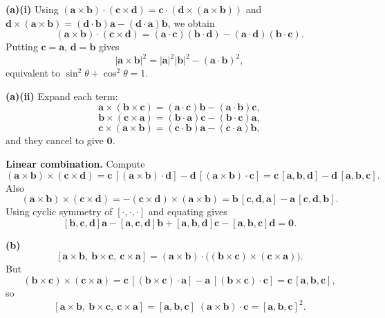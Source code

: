\begin{solution}
\textbf{(a)(i)} Using \((\mathbf a\times\mathbf b)\cdot(\mathbf c\times\mathbf d)=\mathbf c\cdot(\mathbf d\times(\mathbf a\times\mathbf b))\) and
\(\mathbf d\times(\mathbf a\times\mathbf b)=(\mathbf d\cdot\mathbf b)\mathbf a-(\mathbf d\cdot\mathbf a)\mathbf b\), we obtain
\[
(\mathbf a\times\mathbf b)\cdot(\mathbf c\times\mathbf d)
=(\mathbf a\cdot\mathbf c)(\mathbf b\cdot\mathbf d)-(\mathbf a\cdot\mathbf d)(\mathbf b\cdot\mathbf c).
\]
Putting \(\mathbf c=\mathbf a\), \(\mathbf d=\mathbf b\) gives
\[
|\mathbf a\times\mathbf b|^2=|\mathbf a|^2|\mathbf b|^2-(\mathbf a\cdot\mathbf b)^2,
\]
equivalent to \(\sin^2\theta+\cos^2\theta=1\).

\textbf{(a)(ii)} Expand each term:
\[
\mathbf a\times(\mathbf b\times\mathbf c)=(\mathbf a\cdot\mathbf c)\mathbf b-(\mathbf a\cdot\mathbf b)\mathbf c,
\]
\[
\mathbf b\times(\mathbf c\times\mathbf a)=(\mathbf b\cdot\mathbf a)\mathbf c-(\mathbf b\cdot\mathbf c)\mathbf a,
\]
\[
\mathbf c\times(\mathbf a\times\mathbf b)=(\mathbf c\cdot\mathbf b)\mathbf a-(\mathbf c\cdot\mathbf a)\mathbf b,
\]
and they cancel to give \(\mathbf 0\).

\medskip
\noindent\textbf{Linear combination.}
Compute
\[
(\mathbf a\times\mathbf b)\times(\mathbf c\times\mathbf d)
=\mathbf c\,[(\mathbf a\times\mathbf b)\cdot\mathbf d]-\mathbf d\,[(\mathbf a\times\mathbf b)\cdot\mathbf c]
=\mathbf c\,[\mathbf a,\mathbf b,\mathbf d]-\mathbf d\,[\mathbf a,\mathbf b,\mathbf c].
\]
Also
\[
(\mathbf a\times\mathbf b)\times(\mathbf c\times\mathbf d)
=-(\mathbf c\times\mathbf d)\times(\mathbf a\times\mathbf b)
=\mathbf b\,[\mathbf c,\mathbf d,\mathbf a]-\mathbf a\,[\mathbf c,\mathbf d,\mathbf b].
\]
Using cyclic symmetry of \([\cdot,\cdot,\cdot]\) and equating gives
\[
[\mathbf b,\mathbf c,\mathbf d]\mathbf a-[\mathbf a,\mathbf c,\mathbf d]\mathbf b+[\mathbf a,\mathbf b,\mathbf d]\mathbf c-[\mathbf a,\mathbf b,\mathbf c]\mathbf d=\mathbf 0.
\]

\medskip
\noindent\textbf{(b)}
\[
[\mathbf a\times\mathbf b,\ \mathbf b\times\mathbf c,\ \mathbf c\times\mathbf a]
=(\mathbf a\times\mathbf b)\cdot\bigl((\mathbf b\times\mathbf c)\times(\mathbf c\times\mathbf a)\bigr).
\]
But
\[
(\mathbf b\times\mathbf c)\times(\mathbf c\times\mathbf a)
=\mathbf c\,[(\mathbf b\times\mathbf c)\cdot\mathbf a]-\mathbf a\,[(\mathbf b\times\mathbf c)\cdot\mathbf c]
=\mathbf c\,[\mathbf a,\mathbf b,\mathbf c],
\]
so
\[
[\mathbf a\times\mathbf b,\ \mathbf b\times\mathbf c,\ \mathbf c\times\mathbf a]
=[\mathbf a,\mathbf b,\mathbf c]\;(\mathbf a\times\mathbf b)\cdot\mathbf c
=[\mathbf a,\mathbf b,\mathbf c]^2.
\]
\end{solution}

